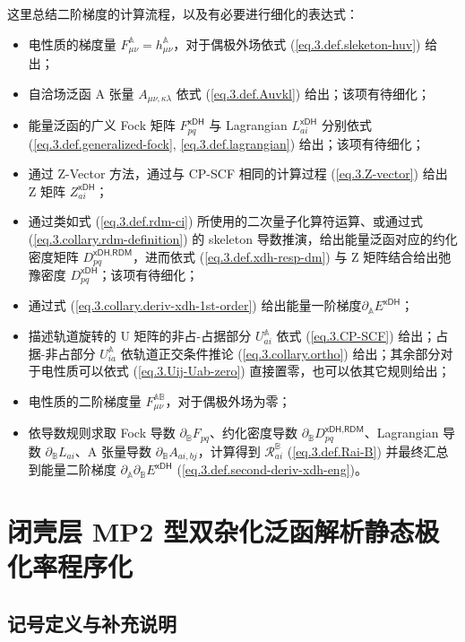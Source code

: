 这里总结二阶梯度的计算流程，以及有必要进行细化的表达式：
\begin{itemize}[nosep]
  \item 电性质的梯度量 $F_{\mu \nu}^{\mathbb{A}} = h_{\mu \nu}^{\mathbb{A}}$，对于偶极外场依式 (\ref{eq.3.def.sleketon-huv}) 给出；
  \item 自洽场泛函 A 张量 $A_{\mu \nu, \kappa \lambda}$ 依式 (\ref{eq.3.def.Auvkl}) 给出；该项有待细化；
  \item 能量泛函的广义 Fock 矩阵 $F_{pq}^\textsf{xDH}$ 与 Lagrangian $L_{ai}^\textsf{xDH}$ 分别依式 (\ref{eq.3.def.generalized-fock}, \ref{eq.3.def.lagrangian}) 给出；该项有待细化；
  \item 通过 Z-Vector 方法，通过与 CP-SCF 相同的计算过程 (\ref{eq.3.Z-vector}) 给出 Z 矩阵 $Z_{ai}^\textsf{xDH}$；
  \item 通过类如式 (\ref{eq.3.def.rdm-ci}) 所使用的二次量子化算符运算、或通过式 (\ref{eq.3.collary.rdm-definition}) 的 skeleton 导数推演，给出能量泛函对应的约化密度矩阵 $D_{pq}^{\textsf{xDH}, \textsf{RDM}}$，进而依式 (\ref{eq.3.def.xdh-resp-dm}) 与 Z 矩阵结合给出弛豫密度 $D_{pq}^\textsf{xDH}$；该项有待细化；
  \item 通过式 (\ref{eq.3.collary.deriv-xdh-1st-order}) 给出能量一阶梯度$\partial_{\mathbb{A}} E^\textsf{xDH}$；
  \item 描述轨道旋转的 U 矩阵的非占-占据部分 $U_{ai}^{\mathbb{A}}$ 依式 (\ref{eq.3.CP-SCF}) 给出；占据-非占部分 $U_{ia}^{\mathbb{A}}$ 依轨道正交条件推论 (\ref{eq.3.collary.ortho}) 给出；其余部分对于电性质可以依式 (\ref{eq.3.Uij-Uab-zero}) 直接置零，也可以依其它规则给出；
  \item 电性质的二阶梯度量 $F_{\mu \nu}^{\mathbb{AB}}$，对于偶极外场为零；
  \item 依导数规则求取 Fock 导数 $\partial_{\mathbb{B}} F_{pq}$、约化密度导数 $\partial_{\mathbb{B}} D_{pq}^{\textsf{xDH}, \textsf{RDM}}$、Lagrangian 导数 $\partial_{\mathbb{B}} L_{ai}$、A 张量导数 $\partial_{\mathbb{B}} A_{ai, bj}$，计算得到 $\mathscr{R}_{ai}^{\mathbb{B}}$ (\ref{eq.3.def.Rai-B}) 并最终汇总到能量二阶梯度 $\partial_{\mathbb{A}} \partial_{\mathbb{B}} E^\textsf{xDH}$ (\ref{eq.3.def.second-deriv-xdh-eng})。
\end{itemize}

\section{闭壳层 MP2 型双杂化泛函解析静态极化率程序化}
\label{sec.3.3.program}

\subsection{记号定义与补充说明}

